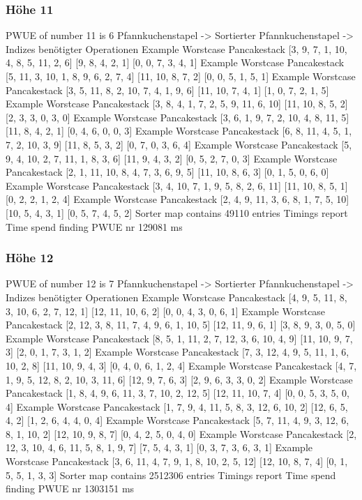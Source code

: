 {    \subsubsection{Höhe 11}

    PWUE of number 11 is 6
    Pfannkuchenstapel -> Sortierter Pfannkuchenstapel -> Indizes benötigter Operationen
Example Worstcase Pancakestack
    [3, 9, 7, 1, 10, 4, 8, 5, 11, 2, 6]
    [9, 8, 4, 2, 1]
    [0, 0, 7, 3, 4, 1]
    Example Worstcase Pancakestack
    [5, 11, 3, 10, 1, 8, 9, 6, 2, 7, 4]
    [11, 10, 8, 7, 2]
    [0, 0, 5, 1, 5, 1]
    Example Worstcase Pancakestack
    [3, 5, 11, 8, 2, 10, 7, 4, 1, 9, 6]
    [11, 10, 7, 4, 1]
    [1, 0, 7, 2, 1, 5]
    Example Worstcase Pancakestack
    [3, 8, 4, 1, 7, 2, 5, 9, 11, 6, 10]
    [11, 10, 8, 5, 2]
    [2, 3, 3, 0, 3, 0]
    Example Worstcase Pancakestack
    [3, 6, 1, 9, 7, 2, 10, 4, 8, 11, 5]
    [11, 8, 4, 2, 1]
    [0, 4, 6, 0, 0, 3]
    Example Worstcase Pancakestack
    [6, 8, 11, 4, 5, 1, 7, 2, 10, 3, 9]
    [11, 8, 5, 3, 2]
    [0, 7, 0, 3, 6, 4]
    Example Worstcase Pancakestack
    [5, 9, 4, 10, 2, 7, 11, 1, 8, 3, 6]
    [11, 9, 4, 3, 2]
    [0, 5, 2, 7, 0, 3]
    Example Worstcase Pancakestack
    [2, 1, 11, 10, 8, 4, 7, 3, 6, 9, 5]
    [11, 10, 8, 6, 3]
    [0, 1, 5, 0, 6, 0]
    Example Worstcase Pancakestack
    [3, 4, 10, 7, 1, 9, 5, 8, 2, 6, 11]
    [11, 10, 8, 5, 1]
    [0, 2, 2, 1, 2, 4]
    Example Worstcase Pancakestack
    [2, 4, 9, 11, 3, 6, 8, 1, 7, 5, 10]
    [10, 5, 4, 3, 1]
    [0, 5, 7, 4, 5, 2]
    Sorter map contains 49110 entries
    Timings report
    Time spend finding PWUE nr 129081 ms
    \subsubsection{Höhe 12}

    PWUE of number 12 is 7
    Pfannkuchenstapel -> Sortierter Pfannkuchenstapel -> Indizes benötigter Operationen
Example Worstcase Pancakestack
    [4, 9, 5, 11, 8, 3, 10, 6, 2, 7, 12, 1]
    [12, 11, 10, 6, 2]
    [0, 0, 4, 3, 0, 6, 1]
    Example Worstcase Pancakestack
    [2, 12, 3, 8, 11, 7, 4, 9, 6, 1, 10, 5]
    [12, 11, 9, 6, 1]
    [3, 8, 9, 3, 0, 5, 0]
    Example Worstcase Pancakestack
    [8, 5, 1, 11, 2, 7, 12, 3, 6, 10, 4, 9]
    [11, 10, 9, 7, 3]
    [2, 0, 1, 7, 3, 1, 2]
    Example Worstcase Pancakestack
    [7, 3, 12, 4, 9, 5, 11, 1, 6, 10, 2, 8]
    [11, 10, 9, 4, 3]
    [0, 4, 0, 6, 1, 2, 4]
    Example Worstcase Pancakestack
    [4, 7, 1, 9, 5, 12, 8, 2, 10, 3, 11, 6]
    [12, 9, 7, 6, 3]
    [2, 9, 6, 3, 3, 0, 2]
    Example Worstcase Pancakestack
    [1, 8, 4, 9, 6, 11, 3, 7, 10, 2, 12, 5]
    [12, 11, 10, 7, 4]
    [0, 0, 5, 3, 5, 0, 4]
    Example Worstcase Pancakestack
    [1, 7, 9, 4, 11, 5, 8, 3, 12, 6, 10, 2]
    [12, 6, 5, 4, 2]
    [1, 2, 6, 4, 4, 0, 4]
    Example Worstcase Pancakestack
    [5, 7, 11, 4, 9, 3, 12, 6, 8, 1, 10, 2]
    [12, 10, 9, 8, 7]
    [0, 4, 2, 5, 0, 4, 0]
    Example Worstcase Pancakestack
    [2, 12, 3, 10, 4, 6, 11, 5, 8, 1, 9, 7]
    [7, 5, 4, 3, 1]
    [0, 3, 7, 3, 6, 3, 1]
    Example Worstcase Pancakestack
    [3, 6, 11, 4, 7, 9, 1, 8, 10, 2, 5, 12]
    [12, 10, 8, 7, 4]
    [0, 1, 5, 5, 1, 3, 3]
    Sorter map contains 2512306 entries
    Timings report
    Time spend finding PWUE nr 1303151 ms
}


